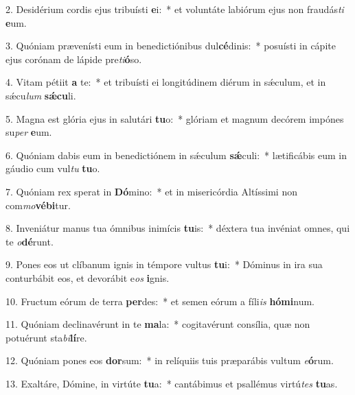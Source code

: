 2. Desidérium cordis ejus tribuísti \textbf{e}i:~*  et voluntáte labiórum ejus non fraudás\textit{ti} \textbf{e}um.\

3. Quóniam prævenísti eum in benedictiónibus dul\textbf{cé}dinis:~*  posuísti in cápite ejus corónam de lápide pre\textit{ti}\textbf{ó}so.\

4. Vitam pétiit \textbf{a} te:~*  et tribuísti ei longitúdinem diérum in sǽculum, et in sǽcu\textit{lum} \textbf{sǽ}\textbf{cu}li.\

5. Magna est glória ejus in salutári \textbf{tu}o:~*  glóriam et magnum decórem impónes su\textit{per} \textbf{e}um.\

6. Quóniam dabis eum in benedictiónem in sǽculum \textbf{sǽ}culi:~*  lætificábis eum in gáudio cum vul\textit{tu} \textbf{tu}o.\

7. Quóniam rex sperat in \textbf{Dó}mino:~*  et in misericórdia Altíssimi non com\textit{mo}\textbf{vé}\textbf{bi}tur.\

8. Inveniátur manus tua ómnibus inimícis \textbf{tu}is:~*  déxtera tua invéniat omnes, qui te \textit{o}\textbf{dé}runt.\

9. Pones eos ut clíbanum ignis in témpore vultus \textbf{tu}i:~*  Dóminus in ira sua conturbábit eos, et devorábit e\textit{os} \textbf{i}gnis.\

10. Fructum eórum de terra \textbf{per}des:~*  et semen eórum a fíli\textit{is} \textbf{hó}\textbf{mi}num.\

11. Quóniam declinavérunt in te \textbf{ma}la:~*  cogitavérunt consília, quæ non potuérunt sta\textit{bi}\textbf{lí}re.\

12. Quóniam pones eos \textbf{dor}sum:~*  in relíquiis tuis præparábis vultum \textit{e}\textbf{ó}rum.\

13. Exaltáre, Dómine, in virtúte \textbf{tu}a:~*  cantábimus et psallémus virtú\textit{tes} \textbf{tu}as.\


